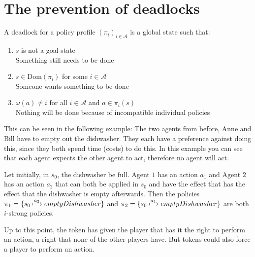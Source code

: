 \section{The prevention of deadlocks}

A deadlock for a policy profile $(\pi_i)_{i \in \mathcal{A}}$ is a global state such that:
\begin{enumerate}
  \item $s$ is not a goal state \\
    Something still needs to be done
  \item $s \in \text{Dom}(\pi_i)$ for some $i \in \mathcal{A}$ \\
    Someone wants something to be done
  \item $\omega(a) \neq i$ for all $i \in \mathcal{A}$ and $a \in \pi_i(s)$ \\
    Nothing will be done because of incompatible individual policies
\end{enumerate}



This can be seen in the following example: The two agents from before, Anne and Bill have to empty out the dishwasher. They each have a preference against doing this, since they both spend time (costs) to do this.
In this example you can see that each agent expects the other agent to act, therefore no agent will act.

Let initially, in $s_0$, the dishwasher be full. Agent $1$ has an action $a_1$ and Agent $2$ has an action $a_2$ that can both be applied in $s_0$ and have the effect that has the effect that the dishwasher is empty afterwards. Then the policies $\pi_1 = \{s_0 \xmapsto{a_2} emptyDishwasher \}$ and $\pi_2 = \{s_0 \xmapsto{a_1} emptyDishwasher \}$ are both $i$-strong policies.


Up to this point, the token has given the player that has it the right to perform an action, a right that none of the other players have. But tokens could also force a player to perform an action.

